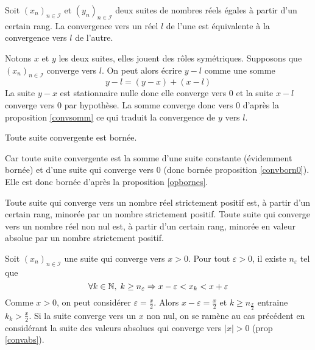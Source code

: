\begin{propn}
 Soit $(x_n)_{n\in \mathcal I}$ et $(y_n)_{n\in \mathcal I}$ deux suites de nombres réels égales à partir d'un certain rang. La convergence vers un réel $l$ de l'une est équivalente à la convergence vers $l$ de l'autre.
\end{propn}
\begin{demo}
Notons $x$ et $y$ les deux suites, elles jouent des rôles symétriques. Supposons que $(x_n)_{n\in \mathcal I}$ converge vers $l$. On peut alors écrire $y-l$ comme une somme
\begin{displaymath}
  y -l = (y-x) + (x-l)
\end{displaymath}
La suite $y-x$ est stationnaire nulle donc elle converge vers $0$ et la suite $x-l$ converge vers $0$ par hypothèse. La somme converge donc vers $0$ d'après la proposition \ref{convsomm} ce qui traduit la convergence de $y$ vers $l$.
\end{demo}

\begin{propn}
 Toute suite convergente est bornée.
\end{propn}
\begin{demo}
 Car toute suite convergente est la somme d'une suite constante (évidemment bornée) et d'une suite qui converge vers $0$ (donc bornée proposition \ref{convborn0}). Elle est donc bornée d'après la proposition \ref{opbornes}.
\end{demo}

\begin{propn} \label{minstrictpos}
 Toute suite qui converge vers un nombre réel strictement positif est, à partir d'un certain rang, minorée par un nombre strictement positif. Toute suite qui converge vers un nombre réel non nul est, à partir d'un certain rang, minorée en valeur absolue par un nombre strictement positif.
\end{propn}
\begin{demo}
Soit $(x_n)_{n\in \mathcal I}$ une suite qui converge vers $x>0$. Pour tout $\varepsilon >0$, il existe $n_{\varepsilon}$ tel que 
\begin{displaymath}
  \forall k\in \mathbb{N}, \; k\geq n_{\varepsilon} \Rightarrow x-\varepsilon < x_k < x + \varepsilon
\end{displaymath}
Comme $x>0$, on peut considérer $\varepsilon = \frac{x}{2}$. Alors $x-\varepsilon = \frac{x}{2}$ et $k \geq n_{\frac{x}{2}}$ entraine $k_k>\frac{x}{2}$.\newline
Si la suite converge vers un $x$ non nul, on se ramène au cas précédent en considérant la suite des valeurs absolues qui converge vers $|x|>0$ (prop \ref{convabs}).
\end{demo}

